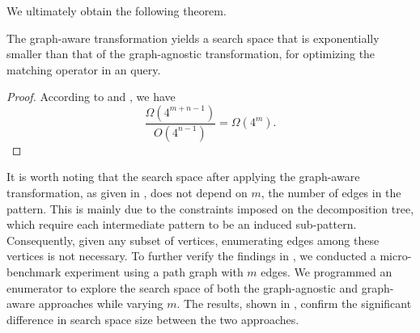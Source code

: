We ultimately obtain the following theorem.

\begin{theorem}
    \label{thm:compare-search-space}
    The graph-aware transformation yields a search space that is exponentially smaller than that of the graph-agnostic transformation,
    for optimizing the matching operator in an \spjm query.
\end{theorem}
\begin{proof}
    According to  and , we have
    \begin{equation*}
        \frac{\Omega(4^{m+n-1})}{O(4^{n-1})} = \Omega(4^m).
    \end{equation*}
\end{proof}

\begin{remark}
    \label{rem:search-space}
    It is worth noting that the search space after applying the graph-aware transformation, as given in , does not depend on $m$, the number of edges in the pattern. This is mainly due to the constraints imposed on the decomposition tree, which require each intermediate pattern to be an induced sub-pattern. Consequently, given any subset of vertices, enumerating edges among these vertices is not necessary. To further verify the findings in , we conducted a micro-benchmark experiment using a path graph with $m$ edges. We programmed an enumerator to explore the search space of both the graph-agnostic and graph-aware approaches while varying $m$. The results, shown in , confirm the significant difference in search space size between the two approaches.
\end{remark}


